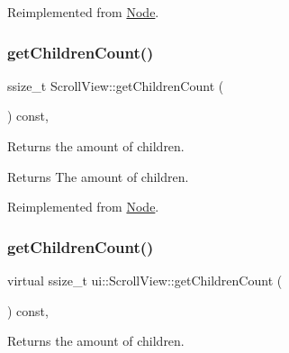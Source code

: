 Reimplemented from \hyperlink{classNode_a25943a94b19e37929b18f93647b58153}{Node}.

\mbox{\label{classui_1_1ScrollView_ab3597728897d06856656a377ef26e73c}} 
\subsubsection{\texorpdfstring{get\+Children\+Count()}{getChildrenCount()}\hspace{0.1cm}{\footnotesize\ttfamily [1/2]}}
{\footnotesize\ttfamily ssize\+\_\+t Scroll\+View\+::get\+Children\+Count (\begin{DoxyParamCaption}{ }\end{DoxyParamCaption}) const\hspace{0.3cm}{\ttfamily [override]}, {\ttfamily [virtual]}}

Returns the amount of children.

\begin{DoxyReturn}{Returns}
The amount of children. 
\end{DoxyReturn}


Reimplemented from \hyperlink{classNode_abe0559adacadcb3a367c8cf7ba65730e}{Node}.

\mbox{\label{classui_1_1ScrollView_a129cd98a1960479ab18dd43486ed0856}} 
\subsubsection{\texorpdfstring{get\+Children\+Count()}{getChildrenCount()}\hspace{0.1cm}{\footnotesize\ttfamily [2/2]}}
{\footnotesize\ttfamily virtual ssize\+\_\+t ui\+::\+Scroll\+View\+::get\+Children\+Count (\begin{DoxyParamCaption}{ }\end{DoxyParamCaption}) const\hspace{0.3cm}{\ttfamily [override]}, {\ttfamily [virtual]}}

Returns the amount of children.

